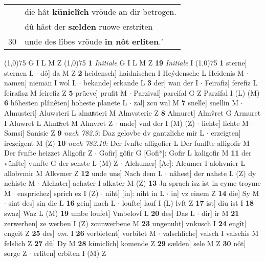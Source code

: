 \documentclass[8pt,a4paper,notitlepage]{article}
\begin{document}
\begin{table}[ht]
\begin{minipage}[t]{0.5\linewidth}
\begin{tabular}{rl}
 & die hât \textbf{küniclîch} vröude an dir betrogen.\\ 
 & dû hâst der \textbf{sælden} ruowe erstriten\\ 
30 & unde des lîbes vröude \textbf{in nôt} \textbf{erliten}."\\ 
\end{tabular}
\scriptsize
\line(1,0){75} \newline
G I L M Z \newline
\line(1,0){75} \newline
\textbf{1} \textit{Initiale} G I L M Z  \textbf{19} \textit{Initiale} I  \newline
\line(1,0){75} \newline
\textbf{1} sterne] sternen L  $\cdot$ dô] da M Z \textbf{2} heidensch] haidnischen I Heýdensche L Heidenis M  $\cdot$ namen] nieman I wol L  $\cdot$ bekande] erkande L \textbf{3} der] wan der I  $\cdot$ Feirafiz] ferefiz L feirafisz M feirefiz Z \textbf{5} prüeve] prufit M  $\cdot$ Parzival] parcifal G Z Parzifal I (L) (M) \textbf{6} hôhesten plânêten] hoheste planete L  $\cdot$ zal] zcu wal M \textbf{7} snelle] snellin M  $\cdot$ Almusteri] Aluwsteri L almuͯsteri M Almvsterie Z \textbf{8} Almuret] Almv̂ret G Armuret I Aluwret L Almuͯret M Almvret Z  $\cdot$ unde] vnd der I (M) (Z)  $\cdot$ liehte] lichte M  $\cdot$ Samsi] Sanisie Z \textbf{9} \textit{nach 782.9:} Daz gelovbe dv gantzliche mir L   $\cdot$ erzeigten] irczeigent M (Z) \textbf{10} \textit{nach 782.10:} Der fvnfte alligofier L  Der funffte alligofir M   $\cdot$ Der fvnfte heizzet Aligofir Z  $\cdot$ Gofir] gôfir G [Gofi*]: Gofir L kaligofir M \textbf{11} der vünfte] vunfte G der sehste L (M) Z  $\cdot$ Alchumer] [Ac]: Alcumer I alohvnier L allobvmir M Alkvmer Z \textbf{12} unde uns] Nach dem L  $\cdot$ nâhest] der nahste L (Z) dy nehiste M  $\cdot$ Alchater] achater I alkater M (Z) \textbf{13} Jn sprach isz ist in eyme troyme M  $\cdot$ ensprichez] sprich ez I (Z)  $\cdot$ niht] [in]: niht in L  $\cdot$ in] vz einem Z \textbf{14} die] Sy M  $\cdot$ sint des] sin die L \textbf{16} gein] nach L  $\cdot$ loufte] lauf I (L) lvft Z \textbf{17} ist] diu ist I \textbf{18} swaz] Waz L (M) \textbf{19} umbe loufet] Vmbelovf L \textbf{20} des] Das L  $\cdot$ dir] ir M \textbf{21} zerwerben] ze werben I (Z) zcunwerbene M \textbf{23} ungenuht] vnkusch I \textbf{24} engît] engeit Z \textbf{25} des] \textit{om.} I \textbf{26} verbietent] vorbitet M  $\cdot$ valschlîche] valsch I valschis M felslich Z \textbf{27} dû] Dy M \textbf{28} küniclîch] komende Z \textbf{29} sælden] sele M Z \textbf{30} nôt] sorge Z  $\cdot$ erliten] erbiten I (M) Z \newline

\end{minipage}
\end{table}
\end{document}
